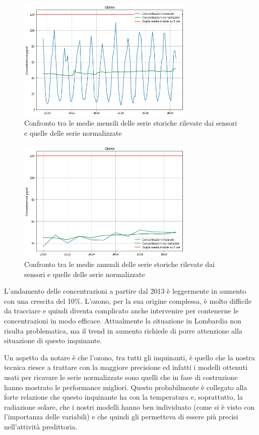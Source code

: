 \documentclass[a4paper]{report}
\begin{document}
\begin{figure}[h]
\centering
\includegraphics[width=0.75\textwidth]{o3_medie_mensili}
\caption{Confronto tra le medie mensili delle serie storiche rilevate dai sensori e quelle delle serie normalizzate}
\label{fig:o3_medie_mensili}
\end{figure}

\begin{figure}[h]
\centering
\includegraphics[width=0.75\textwidth]{o3_medie_annuali}
\caption{Confronto tra le medie annuali delle serie storiche rilevate dai sensori e quelle delle serie normalizzate}
\label{fig:o3_medie_annuali}
\end{figure}

L'andamento delle concentrazioni a partire dal 2013 è leggermente in aumento con una crescita del 10\%. L'ozono, per la sua origine complessa, è molto difficile da tracciare e quindi diventa complicato anche intervenire per contenerne le concentrazioni in modo efficace. Attualmente la situazione in Lombardia non risulta problematica, ma il trend in aumento richiede di porre attenzione alla situazione di questo inquinante.

Un aspetto da notare è che l'ozono, tra tutti gli inquinanti, è quello che la nostra tecnica riesce a trattare con la maggiore precisione ed infatti i modelli ottenuti usati per ricavare le serie normalizzate sono quelli che in fase di costruzione hanno mostrato le performance migliori. Questo probabilmente è collegato alla forte relazione che questo inquinante ha con la temperatura e, soprattutto, la radiazione solare, che i nostri modelli hanno ben individuato (come si è visto con l'importanza delle variabili) e che quindi gli permetteva di essere più precisi nell'attività predittoria.
\end{document}
